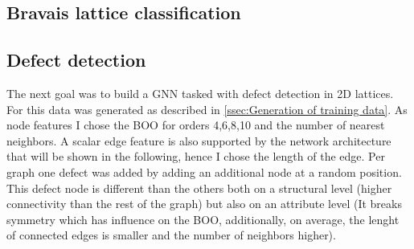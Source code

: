 \documentclass[11pt,a4paper]{article}
\begin{document}
\subsection{Bravais lattice classification}
\label{ssec:Bravais lattice classification}

\subsection{Defect detection}
\label{ssec:Defect detection}
The next goal was to build a GNN tasked with defect detection in 2D lattices. 
For this data was generated as described in \autoref{ssec:Generation of training data}. 
As node features I chose the BOO for orders 4,6,8,10  and the number of nearest neighbors. 
A scalar edge feature is also supported by the network architecture that will be shown in the following, hence I chose the length of the edge. 
Per graph one defect was added by adding an additional node at a random position. 
This defect node is different than the others both on a structural level (higher connectivity than the rest of the graph) but also on an attribute level (It breaks symmetry which has influence on the BOO, additionally, on average, the lenght of connected edges is smaller and the number of neighbors higher). \\
\end{document}
